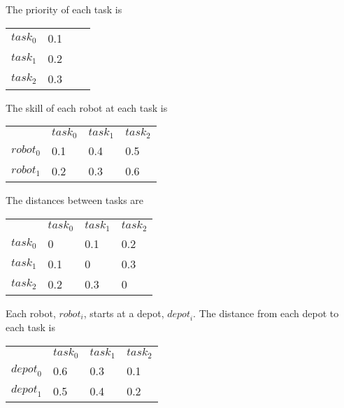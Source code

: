\documentclass[a4paper]{article}
\begin{document}
The priority of each task is

\begin{tabular}{llll}
$\mathit{task}_0$  & 0.1 \\
$\mathit{task}_1$  & 0.2 \\
$\mathit{task}_2$  & 0.3 \\
\end{tabular}
\vspace{1.5em}

The skill of each robot  at each task is

\begin{tabular}{llll}
                   & $\mathit{task}_0$ & $\mathit{task}_1$ & $\mathit{task}_2$ \\
$\mathit{robot}_0$ & 0.1               & 0.4               & 0.5               \\
$\mathit{robot}_1$ & 0.2               & 0.3               & 0.6               \\
\end{tabular}
\vspace{1.5em}

The distances between tasks are

\begin{tabular}{llll}
                   & $\mathit{task}_0$ & $\mathit{task}_1$ & $\mathit{task}_2$ \\
$\mathit{task}_0$  & 0                 & 0.1               & 0.2               \\
$\mathit{task}_1$  & 0.1               & 0                 & 0.3               \\
$\mathit{task}_2$  & 0.2               & 0.3               & 0                 \\
\end{tabular}
\vspace{1.5em}

Each robot, $\mathit{robot}_i$, starts at a depot, $\mathit{depot}_i$. The
distance from each depot to each task is

\begin{tabular}{llll}
                   & $\mathit{task}_0$ & $\mathit{task}_1$ & $\mathit{task}_2$ \\
$\mathit{depot}_0$ & 0.6               & 0.3               & 0.1               \\
$\mathit{depot}_1$ & 0.5               & 0.4               & 0.2               \\
\end{tabular}
\vspace{1.5em}
\end{document}

